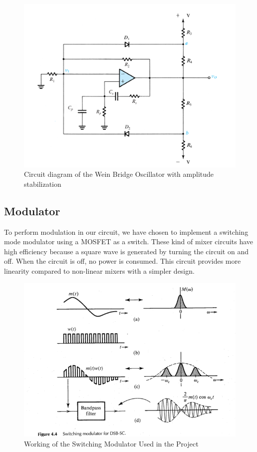 \documentclass[conference]{IEEEtran}
\begin{document}
\begin{figure}
    \centering
    \includegraphics[width=1\linewidth]{Images/wein_bridge_osc_with_amp_stabilization.png}
    \caption{Circuit diagram of the Wein Bridge Oscillator with amplitude stabilization}
\end{figure}


\subsection{Modulator}
To perform modulation in our circuit, we have chosen to implement a switching mode modulator using a MOSFET as a switch. These kind of mixer circuits have high efficiency because a square wave is generated by turning the circuit on and off. When the circuit is off, no power is consumed. This circuit provides more linearity compared to non-linear mixers with a simpler design.
\begin{figure}
    \centering
    \includegraphics[width=0.85\linewidth]{Images/Switching_Modulator_Working.png}
    \caption{Working of the Switching Modulator Used in the Project}
\end{figure}
\end{document}
